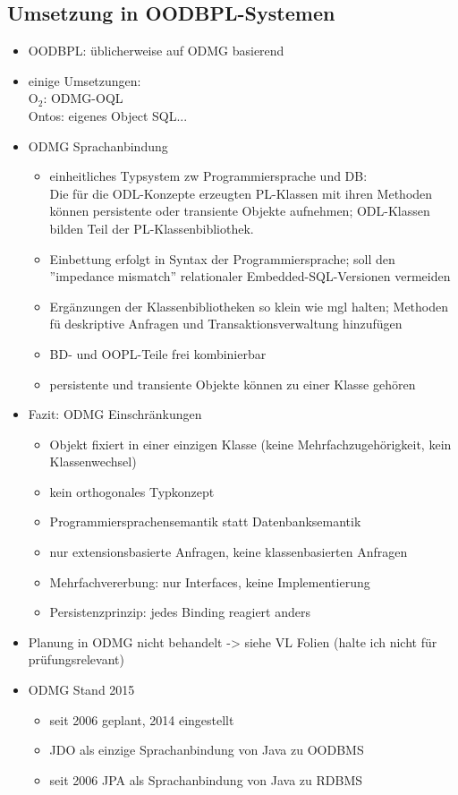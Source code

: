 \subsection{Umsetzung in OODBPL-Systemen}
\begin{itemize}
	\item OODBPL: üblicherweise auf ODMG basierend
	\item einige Umsetzungen:\\
	O$_2$: ODMG-OQL\\
	Ontos: eigenes Object SQL...
	
	\item ODMG Sprachanbindung
	\begin{itemize}
		\item einheitliches Typsystem zw Programmiersprache und DB:\\
		Die für die ODL-Konzepte erzeugten PL-Klassen mit ihren Methoden können persistente oder transiente Objekte aufnehmen; ODL-Klassen bilden Teil der PL-Klassenbibliothek.
		\item Einbettung erfolgt in Syntax der Programmiersprache; soll den ''impedance mismatch'' relationaler Embedded-SQL-Versionen vermeiden
		\item Ergänzungen der Klassenbibliotheken so klein wie mgl halten; Methoden fü deskriptive Anfragen und Transaktionsverwaltung hinzufügen
		\item BD- und OOPL-Teile frei kombinierbar
		\item persistente und transiente Objekte können zu einer Klasse gehören
	\end{itemize}
	
	\item Fazit: ODMG Einschränkungen
	\begin{itemize}
		\item Objekt fixiert in einer einzigen Klasse (keine Mehrfachzugehörigkeit, kein Klassenwechsel)
		\item kein orthogonales Typkonzept
		\item Programmiersprachensemantik statt Datenbanksemantik
		\item nur extensionsbasierte Anfragen, keine klassenbasierten Anfragen
		\item Mehrfachvererbung: nur Interfaces, keine Implementierung
		\item Persistenzprinzip: jedes Binding reagiert anders
	\end{itemize}
	
	\item Planung in ODMG nicht behandelt -> siehe VL Folien (halte ich nicht für prüfungsrelevant)
	\item ODMG Stand 2015
	\begin{itemize}
		\item seit 2006 geplant, 2014 eingestellt
		\item JDO als einzige Sprachanbindung von Java zu OODBMS
		\item seit 2006 JPA als Sprachanbindung von Java zu RDBMS 
	\end{itemize}
\end{itemize}